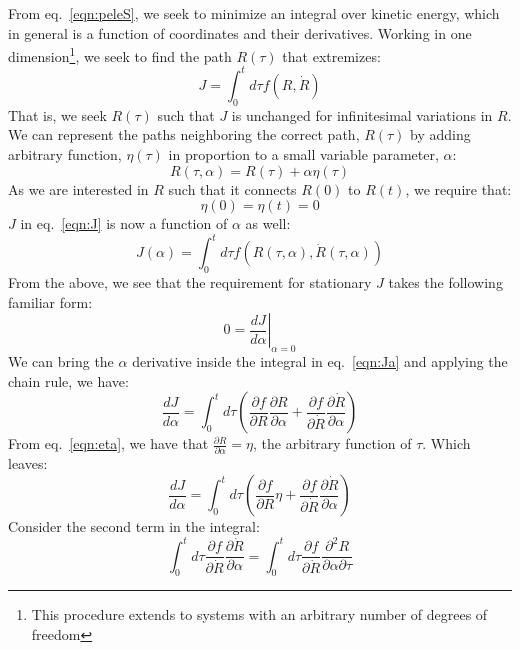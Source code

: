 \documentclass[letter,11pt]{article}
\newcommand{\laeq}[1]{\label{eqn:#1}}
\newcommand{\refeq}[1]{eq.~\ref{eqn:#1}}
\begin{document}
From \refeq{peleS}, we seek to minimize an integral over kinetic energy, which in general is a function of coordinates and their derivatives. Working in one dimension\footnote{This procedure extends to systems with an arbitrary number of degrees of freedom}, we seek to find the path $R(\tau)$ that extremizes:
\begin{equation}\laeq{J}
  J = \int_{0}^{t}d\tau f \left(R, \dot{R} \right)
\end{equation}
That is, we seek $R(\tau)$ such that $J$ is unchanged for infinitesimal variations in $R$. We can represent the paths neighboring the correct path, $R(\tau)$ by adding arbitrary function, $\eta(\tau)$ in proportion to a small variable parameter, $\alpha$:
\begin{equation}\laeq{eta}
  R(\tau,\alpha) = R(\tau) + \alpha\eta(\tau)
\end{equation}
As we are interested in $R$ such that it connects $R(0)$ to $R(t)$, we require that:
\begin{equation}\laeq{eta:bounds}
  \eta(0)=\eta(t)=0
\end{equation}
$J$ in \refeq{J} is now a function of $\alpha$ as well:
\begin{equation}\laeq{Ja}
  J(\alpha) = \int_{0}^{t}d\tau f \left(R(\tau,\alpha), \dot{R}(\tau, \alpha) \right)
\end{equation}
From the above, we see that the requirement for stationary $J$ takes the following familiar form:
\begin{equation}
  0 = {\left. \frac{d J}{d \alpha} \right|}_{\alpha=0}
\end{equation}
We can bring the $\alpha$ derivative inside the integral in \refeq{Ja} and applying the chain rule, we have:
\begin{equation*}
  \frac{d J}{d \alpha} = \int_{0}^{t}d\tau \left( \frac{\partial f}{\partial R}\frac{\partial R}{\partial \alpha} + \frac{\partial f}{\partial \dot{R}}\frac{\partial \dot{R}}{\partial \alpha} \right)
\end{equation*}
From \refeq{eta}, we have that $\frac{\partial R}{\partial \alpha} = \eta$, the arbitrary function of $\tau$. Which leaves:
\begin{equation}\laeq{J:1}
  \frac{d J}{d \alpha} = \int_{0}^{t}d\tau \left( \frac{\partial f}{\partial R}\eta + \frac{\partial f}{\partial \dot{R}}\frac{\partial \dot{R}}{\partial \alpha} \right)
\end{equation}
Consider the second term in the integral:
\begin{equation*}
  \int_{0}^{t}d\tau\frac{\partial f}{\partial \dot{R}}\frac{\partial \dot{R}}{\partial \alpha} = \int_{0}^{t}d\tau\frac{\partial f}{\partial \dot{R}}\frac{\partial^2 R}{\partial \alpha \partial \tau}
\end{equation*}
\end{document}

